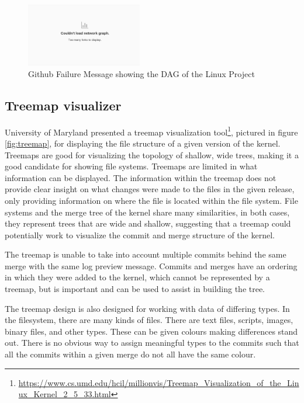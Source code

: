 \documentclass[conference, draftclsnofoot]{IEEEtran}
\begin{document}
\begin{figure}[h!]
        \centering
        \includegraphics[width=0.45\textwidth]{figures/github_viewer.png}
        \caption{Github Failure Message showing the DAG of the Linux Project}
        \label{fig:gitfail}
\end{figure}


\subsection{Treemap visualizer}
University of Maryland presented a treemap visualization
tool\footnote{\url{https://www.cs.umd.edu/hcil/millionvis/Treemap_Visualization_of_the_Linux_Kernel_2_5_33.html}},
pictured in figure \ref{fig:treemap}, for
displaying the file structure of a given version of the kernel. Treemaps are good
for visualizing the topology of shallow, wide trees, making it a good candidate for
showing file systems. Treemaps are limited in what information can be displayed. The
information within the treemap does not provide clear insight on what changes were
made to the files in the given release, only providing information on where the file
is located within the file system.  File systems and the merge tree of the kernel
share many similarities, in both cases, they represent trees that are wide and
shallow, suggesting that a treemap could potentially work to visualize the commit
and merge structure of the kernel.

The treemap is unable to take into account multiple commits behind the same merge
with the same log preview message. Commits and merges have an ordering in which they
were added to the kernel, which cannot be represented by a treemap, but is important
and can be used to assist in building the tree.

The treemap design is also designed for working with data of differing types.
In the filesystem, there are many kinds of files. There are text files,
scripts, images, binary files, and other types. These can be given colours
making differences stand out. There is no obvious way to assign meaningful
types to the commits such that all the commits within a given merge do not all
have the same colour.
\end{document}

